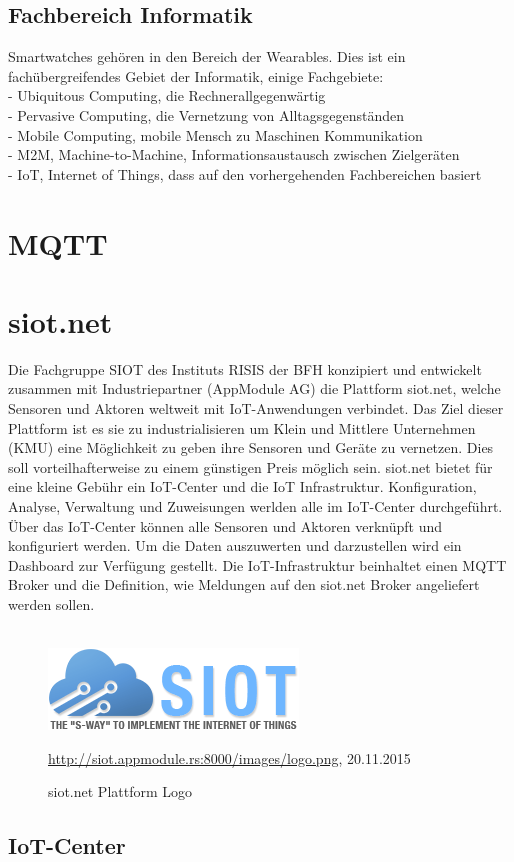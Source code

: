 \subsection{Fachbereich Informatik}
Smartwatches gehören in den Bereich der Wearables. Dies ist ein fachübergreifendes Gebiet der Informatik, einige Fachgebiete:\\
- Ubiquitous Computing, die Rechnerallgegenwärtig \\
- Pervasive Computing, die Vernetzung von Alltagsgegenständen \\
- Mobile Computing, mobile Mensch zu Maschinen Kommunikation \\
- M2M, Machine-to-Machine, Informationsaustausch zwischen Zielgeräten \\
- IoT, Internet of Things, dass auf den vorhergehenden Fachbereichen basiert

\section{MQTT}

\section{siot.net}

Die Fachgruppe SIOT des Instituts RISIS der BFH konzipiert und entwickelt zusammen mit Industriepartner (AppModule AG) die Plattform siot.net, welche Sensoren und Aktoren weltweit mit IoT-Anwendungen verbindet.
Das Ziel dieser Plattform ist es sie zu industrialisieren um Klein und Mittlere Unternehmen (KMU) eine Möglichkeit zu geben ihre Sensoren und Geräte zu vernetzen. Dies soll vorteilhafterweise zu einem günstigen Preis möglich sein.
siot.net bietet für eine kleine Gebühr ein IoT-Center und die IoT Infrastruktur.
Konfiguration, Analyse, Verwaltung und Zuweisungen werlden alle im IoT-Center durchgeführt. Über das IoT-Center können alle Sensoren und Aktoren verknüpft und konfiguriert werden. Um die Daten auszuwerten und darzustellen wird ein Dashboard zur Verfügung gestellt. Die IoT-Infrastruktur beinhaltet einen MQTT Broker und die Definition, wie Meldungen auf den siot.net Broker angeliefert werden sollen.\\\\
\begin{figure}[h]
  \centering
  \includegraphics[scale=1.0]{98_Bilder/02_Grundlagen/siotnetLogo}
  \caption[siot.net Logo]{siot.net Plattform Logo}
  \footnotesize \url{http://siot.appmodule.rs:8000/images/logo.png}, 20.11.2015
\end{figure}
\subsection{IoT-Center}
